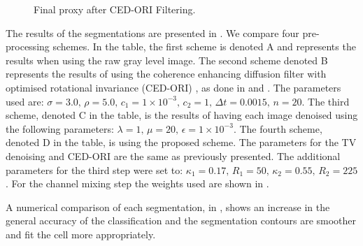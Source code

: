 \begin{figure}[!h]
	\centering
	\caption{Final proxy after CED-ORI Filtering.}
	\label{fig:cedori}
\end{figure}

\begin{definition}
	The results of the segmentations are presented in . We compare four pre-processing schemes. In the table, the first scheme is denoted A and represents the results when using the raw gray level image. The  second scheme denoted B represents the results of using the coherence enhancing diffusion filter with optimised rotational invariance (CED-ORI) \citep{Weickert2002}, as done in \citep{Maska2013} and \citep{Kroon2009}. The parameters used are:
	$\sigma = 3.0, \, \rho = 5.0, \, c_1 = 1 \times 10^{-3}, \, c_2 = 1, \, \Delta t = 0.0015, \, n=20$.
	The third scheme, denoted  C in the table, is the results of having each image denoised using the following parameters: $\lambda = 1, \, \mu = 20,  \, \epsilon = 1 \times 10^{-3}$.
	The fourth scheme, denoted D in the table, is using the proposed scheme. The parameters for the TV denoising and CED-ORI are the same as previously presented. The additional parameters for the third step were set to: $\kappa_1 = 0.17, \, R_1 = 50, \, \kappa_2 = 0.55, \, R_2 = 225$. For the channel mixing step the weights used are shown in .
	
	A numerical comparison of each segmentation, in , shows an increase in the general accuracy of the classification and the segmentation contours are smoother and fit the cell more appropriately.
	
	\begin{figure}[!h]
		\centering
		
		

\end{figure}
\end{definition}

